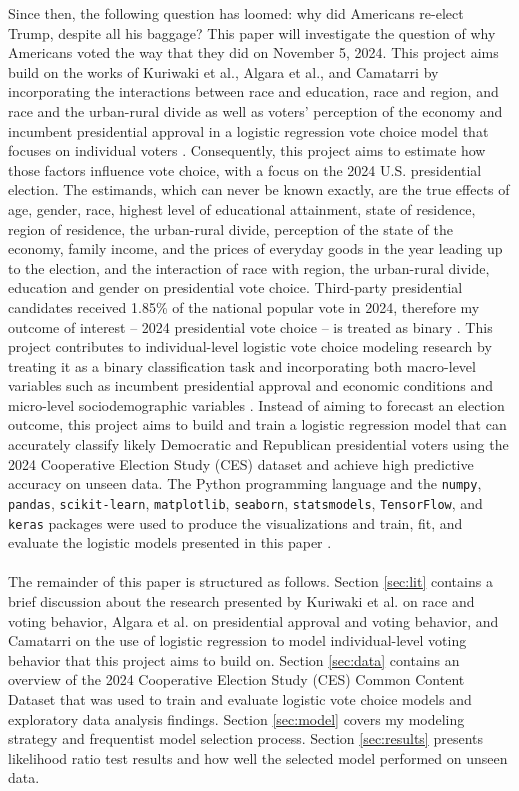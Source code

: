 \documentclass[letter]{article}
\begin{document}
Since then, the following question has loomed: why did Americans re-elect Trump, despite all his baggage? This paper will investigate the question of why Americans voted the way that they did on November 5, 2024. This project aims build on the works of Kuriwaki et al., Algara et al., and Camatarri by incorporating the interactions between race and education, race and region, and race and the urban-rural divide as well as voters' perception of the economy and incumbent presidential approval in a logistic regression vote choice model that focuses on individual voters \cite{kuriwaki} \cite{algara} \cite{camatarri}. Consequently, this project aims to estimate how those factors influence vote choice, with a focus on the 2024 U.S. presidential election. The estimands, which can never be known exactly, are the true effects of age, gender, race, highest level of educational attainment, state of residence, region of residence, the urban-rural divide, perception of the state of the economy, family income, and the prices of everyday goods in the year leading up to the election, and the interaction of race with region, the urban-rural divide, education and gender on presidential vote choice. Third-party presidential candidates received 1.85\% of the national popular vote in 2024, therefore my outcome of interest – 2024 presidential vote choice – is treated as binary \cite{app}. This project contributes to individual-level logistic vote choice modeling research by treating it as a binary classification task and incorporating both macro-level variables such as incumbent presidential approval and economic conditions and micro-level sociodemographic variables \cite{camatarri}. Instead of aiming to forecast an election outcome, this project aims to build and train a logistic regression model that can accurately classify likely Democratic and Republican presidential voters using the 2024 Cooperative Election Study (CES) dataset and achieve high predictive accuracy on unseen data. The Python programming language and the \texttt{numpy},  \texttt{pandas},  \texttt{scikit-learn},  \texttt{matplotlib}, \texttt{seaborn},  \texttt{statsmodels},  \texttt{TensorFlow}, and \texttt{keras} packages were used to produce the visualizations and train, fit, and evaluate the logistic models presented in this paper \cite{python}. \\
\\
The remainder of this paper is structured as follows. Section \ref{sec:lit} contains a brief discussion about the research presented by Kuriwaki et al. on race and voting behavior, Algara et al. on presidential approval and voting behavior, and Camatarri on the use of logistic regression to model individual-level voting behavior that this project aims to build on. Section \ref{sec:data} contains an overview of the 2024 Cooperative Election Study (CES) Common Content Dataset that was used to train and evaluate logistic vote choice models and exploratory data analysis findings.  Section \ref{sec:model} covers my modeling strategy and frequentist model selection process. Section \ref{sec:results} presents likelihood ratio test results and how well the selected model performed on unseen data.
\end{document}
